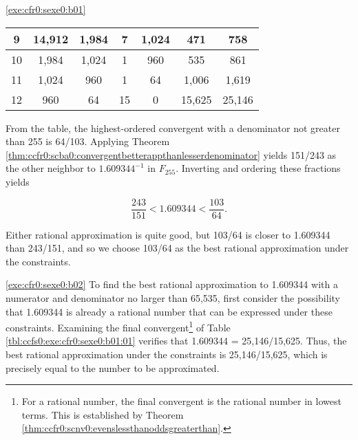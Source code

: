 \begin{vworkexercisesolution}{\ref{exe:cfr0:sexe0:b01}}
\begin{table}
\begin{center}
\begin{tabular}{|c|c|c|c|c|c|c|}
\hline
       \small{9}  &    \small{14,912}      &     \small{1,984}     &     \small{7}   &       \small{1,024}   &    \small{471} &     \small{758}  \\
\hline
      \small{10}  &     \small{1,984}      &     \small{1,024}     &     \small{1}   &         \small{960}   &    \small{535} &     \small{861}  \\
\hline
      \small{11}  &     \small{1,024}      &       \small{960}     &     \small{1}   &          \small{64}   &  \small{1,006} &   \small{1,619} \\
\hline
      \small{12}  &       \small{960}      &        \small{64}     &    \small{15}   &           \small{0}   & \small{15,625} &  \small{25,146} \\
\hline
\end{tabular}
\end{center}
\end{table}

From the table, the highest-ordered convergent with a denominator not greater
than 255 is 64/103.  Applying 
Theorem \ccfrzeroxrefhyphen{}\ref{thm:ccfr0:scba0:convergentbetterappthanlesserdenominator}
yields 151/243 as the other neighbor to 
$1.609344^{-1}$ in $F_{255}$.  Inverting and ordering these 
fractions yields

\begin{equation}
\frac{243}{151} < 1.609344 < \frac{103}{64}.
\end{equation}

Either rational approximation is quite good, but 103/64 is closer
to 1.609344 than 243/151, and so we choose 103/64 as the best
rational approximation under the constraints.
\end{vworkexercisesolution}
\vworkexerciseseparator
\begin{vworkexercisesolution}{\ref{exe:cfr0:sexe0:b02}}
To find the best rational approximation to 1.609344 with
a numerator and denominator no larger than 65,535, first consider the
possibility that 1.609344 is already a rational number that can
be expressed under these constraints.  Examining the final
convergent\footnote{For a rational number, the final convergent
is the rational number in lowest terms.  This is established
by Theorem \ccfrzeroxrefhyphen{}\ref{thm:ccfr0:scnv0:evenslessthanoddsgreaterthan}.}
of Table \ref{tbl:ccfs0:exe:cfr0:sexe0:b01:01} verifies
that 1.609344 = 25,146/15,625.  Thus, the best rational 
approximation under
the constraints is 25,146/15,625, which is precisely equal to the
number to be approximated.
\end{vworkexercisesolution}
\vworkexercisechapterfooter

